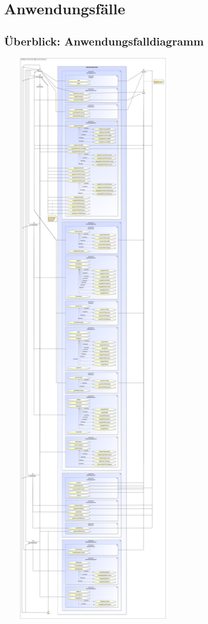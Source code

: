 \documentclass[a4paper]{article}
\begin{document}
\section{Anwendungsfälle}

\subsection{Überblick: Anwendungsfalldiagramm}

\includegraphics[width=350px]{use-case-diagramm.jpg}
\end{document}
